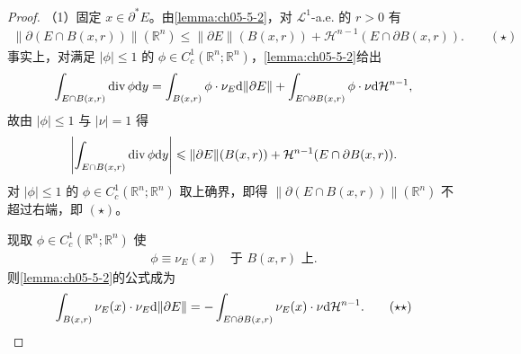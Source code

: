 \documentclass[../../main.tex]{subfiles}%
\begin{document}
\begin{proof}
（1）固定 $x\in\partial^*E$。由\cref{lemma:ch05-5-2}，对 $\mathcal{L}^1$-a.e. 的 $r>0$ 有%
\begin{align*}
\lVert\partial(E\cap B(x,r))\rVert(\mathbb{R}^n)\leqslant\lVert\partial E\rVert(B(x,r))+\mathcal{H}^{n-1}(E\cap\partial B(x,r)) .\qquad(\star)
\end{align*}
事实上，对满足 $\lvert\phi\rvert\leqslant1$ 的 $\phi\in C_c^1(\mathbb{R}^n;\mathbb{R}^n)$，\cref{lemma:ch05-5-2}给出%
\begin{align*}
\int_{E\cap B(x,r)}\operatorname{div}\phi\mathrm{d} y=\int_{B(x,r)}\phi\cdot\nu_E\mathrm{d}\lVert\partial E\rVert+\int_{E\cap\partial B(x,r)}\phi\cdot\nu\mathrm{d}\mathcal{H}^{n-1},
\end{align*}
故由 $\lvert\phi\rvert\leqslant1$ 与 $\lvert\nu\rvert=1$ 得
\begin{align*}
\left\lvert\int_{E\cap B(x,r)}\operatorname{div}\phi\mathrm{d} y\right\rvert\leqslant\lVert\partial E\rVert(B(x,r))+\mathcal{H}^{n-1}(E\cap\partial B(x,r)) .
\end{align*}
对 $\lvert\phi\rvert\leqslant1$ 的 $\phi\in C_c^1(\mathbb{R}^n;\mathbb{R}^n)$ 取上确界，即得 $\lVert\partial(E\cap B(x,r))\rVert(\mathbb{R}^n)$ 不超过右端，即 $(\star)$。

现取 $\phi\in C_c^1(\mathbb{R}^n;\mathbb{R}^n)$ 使
\begin{align*}
\phi\equiv\nu_E(x)\quad\text{于 }B(x,r)\text{ 上}.
\end{align*}
则\cref{lemma:ch05-5-2}的公式成为%
\begin{align*}
\int_{B(x,r)}\nu_E(x)\cdot\nu_E\mathrm{d}\lVert\partial E\rVert=-\int_{E\cap\partial B(x,r)}\nu_E(x)\cdot\nu\mathrm{d}\mathcal{H}^{n-1} .\qquad(\star\star)
\end{align*}


\end{proof}
\end{document}
